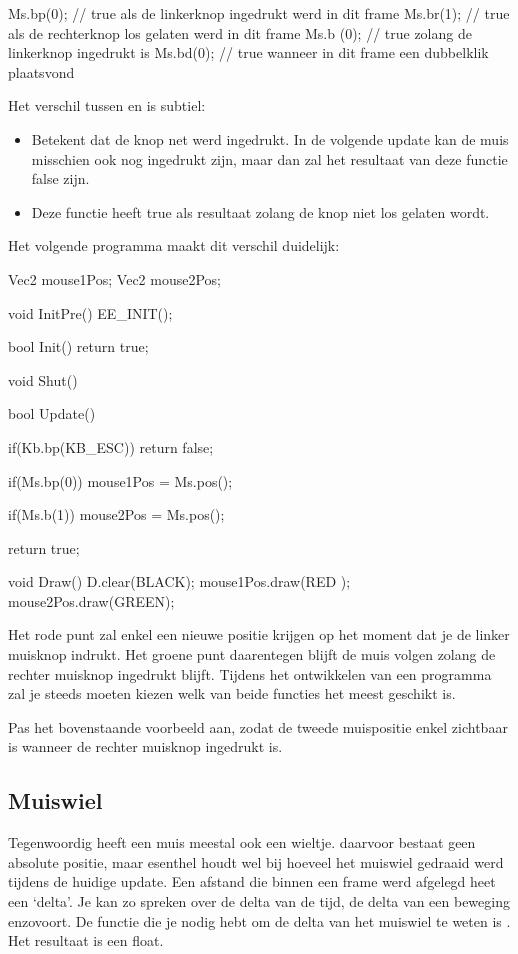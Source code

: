 \begin{code}
Ms.bp(0); // true als de linkerknop ingedrukt werd in dit frame
Ms.br(1); // true als de rechterknop los gelaten werd in dit frame
Ms.b (0); // true zolang de linkerknop ingedrukt is
Ms.bd(0); // true wanneer in dit frame een dubbelklik plaatsvond
\end{code}

Het verschil tussen  en  is subtiel:
\begin{itemize}
	\item {} Betekent dat de knop net werd ingedrukt. In de volgende update kan de muis misschien ook nog ingedrukt zijn, maar dan zal het resultaat van deze functie false zijn.
	\item {} Deze functie heeft true als resultaat zolang de knop niet los gelaten wordt.
\end{itemize}

Het volgende programma maakt dit verschil duidelijk:

\begin{code}
Vec2 mouse1Pos;
Vec2 mouse2Pos;

void InitPre()
{
   EE_INIT();
}

bool Init()
{   
   return true;
}

void Shut() {}

bool Update()
{
   if(Kb.bp(KB_ESC)) return false;
   
   if(Ms.bp(0)) {
      mouse1Pos = Ms.pos();
   }
   
   if(Ms.b(1)) {
      mouse2Pos = Ms.pos();
   }
   
   return true;
}

void Draw()
{
   D.clear(BLACK);
   mouse1Pos.draw(RED  );
   mouse2Pos.draw(GREEN);
}
\end{code}

Het rode punt zal enkel een nieuwe positie krijgen op het moment dat je de linker muisknop indrukt. Het groene punt daarentegen blijft de muis volgen zolang de rechter muisknop ingedrukt blijft. Tijdens het ontwikkelen van een programma zal je steeds moeten kiezen welk van beide functies het meest geschikt is.

\begin{exercise}
Pas het bovenstaande voorbeeld aan, zodat de tweede muispositie enkel zichtbaar is wanneer de rechter muisknop ingedrukt is.
\end{exercise} 


\subsection{Muiswiel}
Tegenwoordig heeft een muis meestal ook een wieltje. daarvoor bestaat geen absolute positie, maar esenthel houdt wel bij hoeveel het muiswiel gedraaid werd tijdens de huidige update. Een afstand die binnen een frame werd afgelegd heet een `delta'. Je kan zo spreken over de delta van de tijd, de delta van een beweging enzovoort. De functie die je nodig hebt om de delta van het muiswiel te weten is . Het resultaat is een float.

